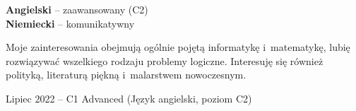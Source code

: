 \documentclass[8pt]{developercv} %
\begin{document}
\begin{minipage}[t]{0.3\textwidth}
  \vspace{-\baselineskip} %


  \textbf{Angielski} -- zaawansowany (C2)\\
  \textbf{Niemiecki} -- komunikatywny
\end{minipage}
\hfill
\begin{minipage}[t]{0.3\textwidth}
  \vspace{-\baselineskip} %


  Moje zainteresowania obejmują ogólnie pojętą informatykę i~matematykę,
  lubię rozwiązywać wszelkiego rodzaju problemy logiczne.
  Interesuję się również polityką, literaturą piękną i~malarstwem nowoczesnym.
\end{minipage}
\hfill
\begin{minipage}[t]{0.35\textwidth}
  \vspace{-\baselineskip} %

  Lipiec 2022 -- C1 Advanced (Język angielski, poziom C2)
\end{minipage}

\end{document}
